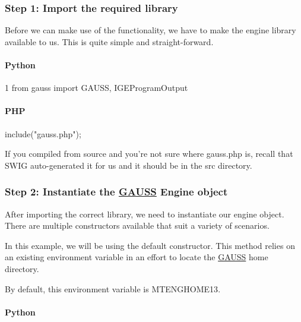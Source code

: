 \subsubsection*{Step 1\-: Import the required library}

Before we can make use of the functionality, we have to make the engine library available to us. This is quite simple and straight-\/forward.

\paragraph*{Python}


\begin{DoxyCode}
1 \textcolor{keyword}{from} gauss \textcolor{keyword}{import} GAUSS, IGEProgramOutput
\end{DoxyCode}


\paragraph*{P\-H\-P}


\begin{DoxyCode}
include(\textcolor{stringliteral}{"gauss.php"});
\end{DoxyCode}


If you compiled from source and you're not sure where {\ttfamily gauss.\-php} is, recall that S\-W\-I\-G auto-\/generated it for us and it should be in the {\ttfamily src} directory.

\subsubsection*{Step 2\-: Instantiate the \hyperlink{class_g_a_u_s_s}{G\-A\-U\-S\-S} Engine object}

After importing the correct library, we need to instantiate our engine object. There are multiple constructors available that suit a variety of scenarios.

In this example, we will be using the default constructor. This method relies on an existing environment variable in an effort to locate the \hyperlink{class_g_a_u_s_s}{G\-A\-U\-S\-S} home directory.

By default, this environment variable is {\ttfamily M\-T\-E\-N\-G\-H\-O\-M\-E13}.

\paragraph*{Python}


